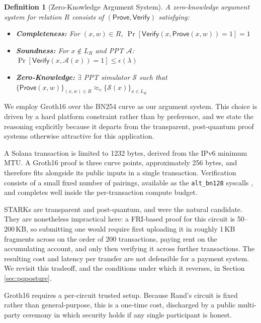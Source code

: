 \documentclass[11pt,a4paper]{article}
\newtheorem{definition}[theorem]{Definition}
\begin{document}
\begin{definition}[Zero-Knowledge Argument System]
A zero-knowledge argument system for relation $R$ consists of $(\mathsf{Prove}, \mathsf{Verify})$ satisfying:
\begin{itemize}
    \item \textbf{Completeness:} For $(x, w) \in R$, $\Pr[\mathsf{Verify}(x, \mathsf{Prove}(x, w)) = 1] = 1$
    \item \textbf{Soundness:} For $x \notin L_R$ and PPT $\mathcal{A}$: $\Pr[\mathsf{Verify}(x, \mathcal{A}(x)) = 1] \leq \epsilon(\lambda)$
    \item \textbf{Zero-Knowledge:} $\exists$ PPT simulator $\mathcal{S}$ such that $\{\mathsf{Prove}(x, w)\}_{(x,w) \in R} \approx_c \{\mathcal{S}(x)\}_{x \in L_R}$
\end{itemize}
\end{definition}

We employ Groth16 \cite{Groth2016} over the BN254 curve as our argument system. This choice is driven by a hard platform constraint rather than by preference, and we state the reasoning explicitly because it departs from the transparent, post-quantum proof systems otherwise attractive for this application.

A Solana transaction is limited to 1232 bytes, derived from the IPv6 minimum MTU. A Groth16 proof is three curve points, approximately 256 bytes, and therefore fits alongside its public inputs in a single transaction. Verification consists of a small fixed number of pairings, available as the \texttt{alt\_bn128} syscalls \cite{SolanaAltBn128}, and completes well inside the per-transaction compute budget.

STARKs \cite{BenSasson2018} are transparent and post-quantum, and were the natural candidate. They are nonetheless impractical here: a FRI-based proof for this circuit is 50--200\,KB, so submitting one would require first uploading it in roughly 1\,KB fragments across on the order of 200 transactions, paying rent on the accumulating account, and only then verifying it across further transactions. The resulting cost and latency per transfer are not defensible for a payment system. We revisit this tradeoff, and the conditions under which it reverses, in Section \ref{sec:pqposture}.

Groth16 requires a per-circuit trusted setup. Because Rand's circuit is fixed rather than general-purpose, this is a one-time cost, discharged by a public multi-party ceremony in which security holds if any single participant is honest.
\end{document}
